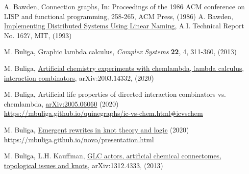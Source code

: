 \documentclass{article}
\begin{document}
\begin{thebibliography}{99}
\vspace{.5cm}

 A. Bawden, Connection graphs, In: Proceedings of the 1986 ACM conference on LISP and functional programming, 258-265, ACM Press, (1986)
 A. Bawden, \href{http://citeseerx.ist.psu.edu/viewdoc/download?doi=10.1.1.18.5446&rep=rep1&type=pdf}{Implementing Distributed Systems Using Linear Naming}, A.I. Technical Report No. 1627, MIT, (1993)

 M. Buliga, \href{https://arxiv.org/abs/1305.5786}{Graphic lambda calculus}, {\it Complex Systems} {\bf 22}, 4, 311-360, (2013)

 M. Buliga, \href{https://arxiv.org/abs/2003.14332}{Artificial chemistry experiments with chemlambda, lambda calculus, interaction combinators}, arXiv:2003.14332, (2020)

 M. Buliga, Artificial life properties of directed interaction combinators vs. chemlambda, \href{https://arxiv.org/abs/2005.06060}{arXiv:2005.06060} (2020)\\
\href{https://mbuliga.github.io/quinegraphs/ic-vs-chem.html#icvschem}{https://mbuliga.github.io/quinegraphs/ic-vs-chem.html\#icvschem}

 M. Buliga, \href{https://mbuliga.github.io/novo/presentation.html}{Emergent rewrites in knot theory and logic} (2020)\\ \href{https://mbuliga.github.io/novo/presentation.html}{https://mbuliga.github.io/novo/presentation.html}

 M. Buliga, L.H. Kauffman, \href{https://arxiv.org/abs/1312.4333}{GLC actors, artificial chemical connectomes, topological issues and knots}, arXiv:1312.4333, (2013)





\end{thebibliography}
\end{document}
